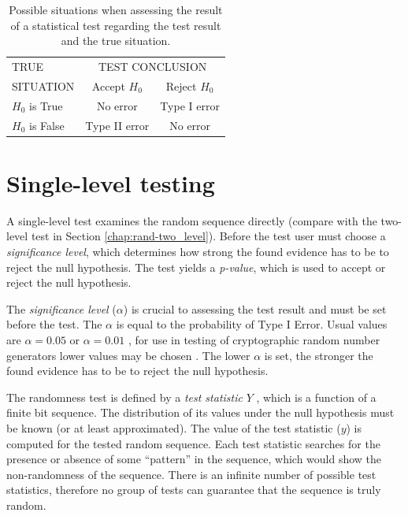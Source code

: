 \documentclass[
  digital,     %
  oneside,     %
  nosansbold,  %
  nocolorbold, %
  nolof,         %
  nolot,         %
]{fithesis4}
\begin{document}
\begin{table}
  \begin{tabularx}{0.7\textwidth}{l|c|c}
    TRUE  & \multicolumn{2}{c}{TEST CONCLUSION}\\
    SITUATION &Accept $H_0$ & Reject $H_0$\\
    \midrule
    $H_0$ is True &  No error & Type I error  \\
    $H_0$ is False & Type II error & No error \\
  \end{tabularx}
  \caption{Possible situations when assessing the result of a statistical test regarding the test result and the true situation.}
  \label{tab:type_errors}
\end{table}

\section{Single-level testing} \label{chap:rand-single}

A single-level test examines the random sequence directly (compare with the two-level test in Section \ref{chap:rand-two_level}). Before the test user must choose a \emph{significance level}, which determines how strong the found evidence has to be to reject the null hypothesis. The test yields a \emph{p-value}, which is used to accept or reject the null hypothesis.

The \emph{significance level} ($\alpha$) is crucial to assessing the test result and must be set before the test. The $\alpha$ is equal to the probability of Type I Error. Usual values are $\alpha = 0.05$ or $\alpha = 0.01$ \cite[p. 390]{basic_practice}, for use in testing of cryptographic random number generators lower values may be chosen \cite[p. 1-4]{nist_special}. The lower $\alpha$ is set, the stronger the found evidence has to be to reject the null hypothesis. %


The randomness test is defined by a \emph{test statistic} $Y$ \cite[p.~4]{tu01_paper}, which is a function of a finite bit sequence. The distribution of its values under the null hypothesis must be known (or at least approximated). The value of the test statistic ($y$) is computed for the tested random sequence. Each test statistic searches for the presence or absence of some ``pattern'' in the sequence, which would show the non-randomness of the sequence. There is an infinite number of possible test statistics, therefore no group of tests can guarantee that the sequence is truly random.
\end{document}
